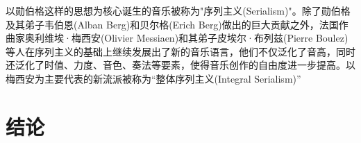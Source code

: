 \documentclass{article}
\begin{document}
以勋伯格这样的思想为核心诞生的音乐被称为"序列主义(Serialism)"。除了勋伯格及其弟子韦伯恩(Alban Berg)和贝尔格(Erich Berg)做出的巨大贡献之外，法国作曲家奥利维埃·梅西安(Olivier Messiaen)和其弟子皮埃尔·布列兹(Pierre Boulez)等人在序列主义的基础上继续发展出了新的音乐语言，他们不仅泛化了音高，同时还泛化了时值、力度、音色、奏法等要素，使得音乐创作的自由度进一步提高。以梅西安为主要代表的新流派被称为“整体序列主义(Integral Serialism)”

\section{结论}



\end{document}
